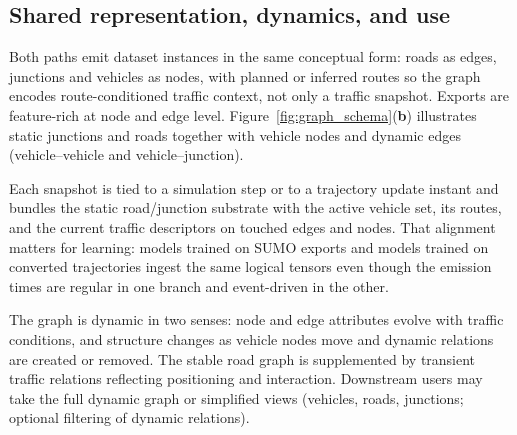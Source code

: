\subsection{Shared representation, dynamics, and use}
Both paths emit dataset instances in the same conceptual form: roads as edges, junctions and vehicles as nodes, with planned or inferred routes so the graph encodes route-conditioned traffic context, not only a traffic snapshot. Exports are feature-rich at node and edge level. Figure~\ref{fig:graph_schema}(\textbf{b}) illustrates static junctions and roads together with vehicle nodes and dynamic edges (vehicle--vehicle and vehicle--junction).

Each snapshot is tied to a simulation step or to a trajectory update instant and bundles the static road/junction substrate with the active vehicle set, its routes, and the current traffic descriptors on touched edges and nodes. That alignment matters for learning: models trained on SUMO exports and models trained on converted trajectories ingest the same logical tensors even though the emission times are regular in one branch and event-driven in the other.

The graph is dynamic in two senses: node and edge attributes evolve with traffic conditions, and structure changes as vehicle nodes move and dynamic relations are created or removed. The stable road graph is supplemented by transient traffic relations reflecting positioning and interaction. Downstream users may take the full dynamic graph or simplified views (vehicles, roads, junctions; optional filtering of dynamic relations).
